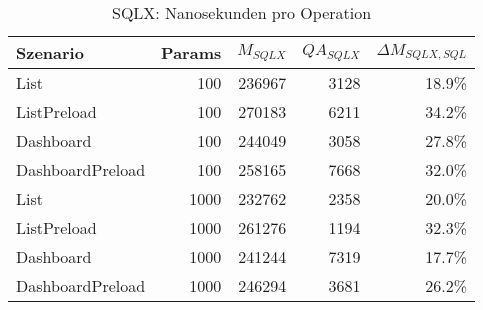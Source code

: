 
\begin{table}[ht]
\centering
\caption{SQLX: Nanosekunden pro Operation}
\begin{tabular}{lrrrr}
\toprule
Szenario & Params & ${M_{SQLX}}$ & ${QA_{SQLX}}$ & ${\Delta M_{SQLX,SQL}}$  \\
\midrule

	List & 100 & 236967 & 3128 & 18.9\% \\
	ListPreload & 100 & 270183 & 6211 & 34.2\% \\
	Dashboard & 100 & 244049 & 3058 & 27.8\% \\
	DashboardPreload & 100 & 258165 & 7668 & 32.0\% \\
	List & 1000 & 232762 & 2358 & 20.0\% \\
	ListPreload & 1000 & 261276 & 1194 & 32.3\% \\
	Dashboard & 1000 & 241244 & 7319 & 17.7\% \\
	DashboardPreload & 1000 & 246294 & 3681 & 26.2\% \\
\bottomrule
\end{tabular}
\label{tab:benchmark_sqlx_nsperop}
\end{table}
	